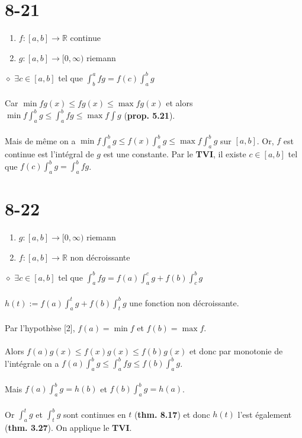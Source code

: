 \documentclass[a4paper,10pt]{article}
\begin{document}
\section*{8-21}
\begin{enumerate}
 \item $f:[a,b] \rightarrow \mathbb{R}$ continue
 \item $g:[a,b] \rightarrow [0, \infty)$ riemann
\end{enumerate}
$\diamond$ $\exists c \in [a,b]$ tel que $\int_b^a fg = f(c) \int_a^b g$
\\
\\
Car $\min f g(x) \leq fg(x) \leq \max f g(x)$ et alors $\min f \int_a^b g \leq \int_a^b fg \leq \max f \int g$ (\textbf{prop. 5.21}).
\\
\\
Mais de même on a $\min f \int_a^b g \leq f(x) \int_a^b g \leq \max f \int_a^b g$ sur $[a,b]$. Or, $f$ est continue est l'intégral de $g$
est une constante. Par le \textbf{TVI}, il existe $c \in [a,b]$ tel que $f(c) \int_a^b g = \int_a^b fg$.

\section*{8-22}
\begin{enumerate}
 \item $g:[a,b] \rightarrow [0, \infty)$ riemann
 \item $f:[a,b] \rightarrow \mathbb{R}$ non décroissante
\end{enumerate}
$\diamond$ $\exists c \in [a,b]$ tel que $\int_a^b fg = f(a) \int_a^c g + f(b) \int_c^b g$
\\
\\
$h(t) := f(a) \int_a^t g + f(b) \int_t^b g$ une fonction non décroissante.
\\
\\
Par l'hypothèse [2], $f(a) = \min f$ et $f(b) = \max f$.
\\
\\
Alors $f(a)g(x) \leq f(x)g(x) \leq f(b)g(x)$ et donc par monotonie de l'intégrale on a $f(a)\int_a^b g \leq \int_a^b fg \leq f(b) \int_a^b g$.
\\
\\
Mais $f(a)\int_a^b g = h(b)$ et $f(b)\int_a^b g = h(a)$.
\\
\\
Or $\int_a^t g$ et $\int_t^b g$ sont continues en $t$ (\textbf{thm. 8.17}) et donc $h(t)$ l'est également (\textbf{thm. 3.27}). On applique le \textbf{TVI}.
\end{document}
